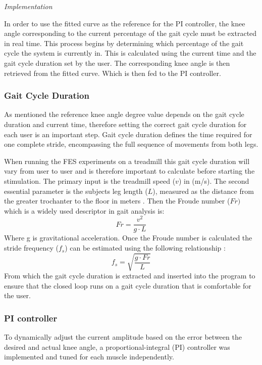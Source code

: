 \textit{Implementation}

In order to use the fitted curve as the reference for the PI controller, the knee angle corresponding to the current percentage of the gait cycle must be extracted in real time. This process begins by determining which percentage of the gait cycle the system is currently in. This is calculated using the current time and the gait cycle duration set by the user. The corresponding knee angle is then retrieved from the fitted curve. Which is then fed to the PI controller.

\subsubsection{Gait Cycle Duration}
As mentioned the reference knee angle degree value depends on the gait cycle duration and current time, therefore setting the correct gait cycle duration for each user is an important step. Gait cycle duration defines the time required for one complete stride, encompassing the full sequence of movements from both legs. 

When running the FES experiments on a treadmill this gait cycle duration will vary from user to user and is therefore important to calculate before starting the stimulation. The primary input is the treadmill speed (\(v\)) in (m/s). The second essential parameter is the subjects leg length (\(L\)), measured as the distance from the greater trochanter to the floor in meters \cite{meinders_how_2021}. Then the Froude number (\(Fr)\) which is a widely used descriptor in gait analysis is:
\begin{equation}
    Fr = \frac{v^2}{g \cdot L}
\end{equation}
Where g is gravitational acceleration. Once the Froude number is calculated the stride frequency (\(f_s\)) can be estimated using the following relationship \cite{meinders_how_2021}:
\begin{equation}
    f_s = \sqrt{\frac{g \cdot Fr}{L}}
\end{equation}
From which the gait cycle duration is extracted and inserted into the program to ensure that the closed loop runs on a gait cycle duration that is comfortable for the user.


\subsubsection{PI controller}
To dynamically adjust the current amplitude based on the error between the desired and actual knee angle, a proportional-integral (PI) controller was implemented and tuned for each muscle independently. 
\newline


